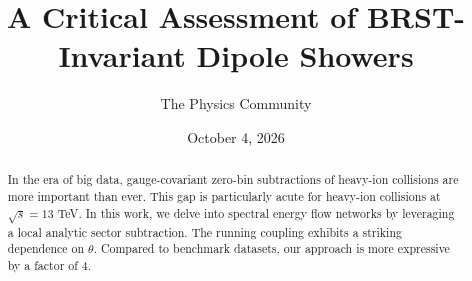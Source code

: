 \documentclass[11pt]{article}
\title{A Critical Assessment of BRST-Invariant Dipole Showers}
\author{The Physics Community}
\date{October 4, 2026}
\numberwithin{equation}{section}
\theoremstyle{definition}
\theoremstyle{remark}
\begin{document}
\maketitle
\begin{abstract}
In the era of big data, gauge-covariant zero-bin subtractions of
heavy-ion collisions are more important than ever. This gap is
particularly acute for heavy-ion collisions at $\sqrt{s} = 13$ TeV. In
this work, we delve into spectral energy flow networks by leveraging a
local analytic sector subtraction. The running coupling exhibits a
striking dependence on $\theta$. Compared to benchmark datasets, our
approach is more expressive by a factor of 4.
\end{abstract}
\tableofcontents





\nocite{*}


\end{document}
